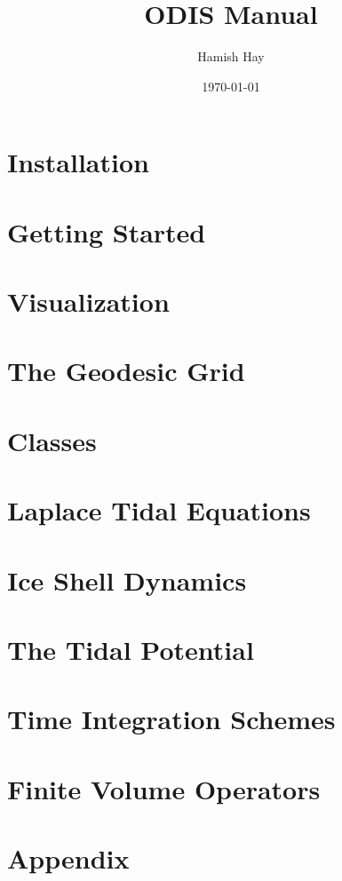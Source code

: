 \documentclass[10pt]{article}
\title{ODIS Manual}
\author{Hamish Hay}
\date{\today}
\begin{document}
\maketitle

\tableofcontents

%

\section{Installation}

\section{Getting Started}

\section{Visualization}

\section{The Geodesic Grid}

\section{Classes}



\section{Laplace Tidal Equations}

\section{Ice Shell Dynamics}

\section{The Tidal Potential}

\section{Time Integration Schemes}

\section{Finite Volume Operators}

\section{Appendix}

%



\printbibliography
\end{document}
